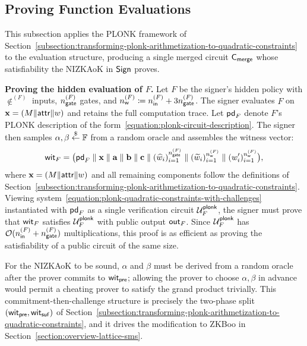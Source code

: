 \subsection{Proving \SMS Function Evaluations}
\label{subsection:proving-sms-function-evaluations}

This subsection applies the PLONK framework of
Section~\ref{subsection:transforming-plonk-arithmetization-to-quadratic-constraints}
to the \SMS evaluation structure,
producing a single merged circuit $\mathsf{C}_\mathsf{merge}$
whose satisfiability the NIZKAoK in $\mathsf{Sign}$ proves.

\medskip
\noindent\textbf{Proving the hidden evaluation of $F$.}
Let $F$ be the signer's hidden policy
with $\nin^{(F)}$ inputs, $n_\mathsf{gate}^{(F)}$ gates,
and $n_\mathsf{w}^{(F)} \coloneqq n_\mathsf{in}^{(F)} + 3n_\mathsf{gate}^{(F)}$.
The signer evaluates $F$ on $\mathbf{x} = (M \| \mathsf{attr} \| w)$
and retains the full computation trace.
Let $\mathsf{pd}_F$ denote $F$'s PLONK description
of the form~\eqref{equation:plonk-circuit-description}.
The signer then samples $\alpha, \beta \stackrel{\$}{\gets} \mathbb{F}$ from a random oracle
and assembles the witness vector:
\begin{equation}\label{equation:sms-ww-F}
\mathsf{wit}_F =
\bigl(
\mathsf{pd}_F \;\|\;
\mathbf{x} \;\|\; \mathbf{a} \;\|\; \mathbf{b} \;\|\; \mathbf{c} \;\|\;
(\widehat{w}_i)_{i = 1}^{n_\mathsf{gate}^{(F)}} \;\|\;
(\widetilde{w}_i)_{i = 1}^{n_\mathsf{w}^{(F)}} \;\|\;
(w'_i)_{i = 1}^{n_\mathsf{w}^{(F)}}
\bigr),
\end{equation}
where $\mathbf{x} = (M \| \mathsf{attr} \| w)$
and all remaining components follow the definitions of
Section~\ref{subsection:transforming-plonk-arithmetization-to-quadratic-constraints}.
Viewing system~\eqref{equation:plonk-quadratic-constraints-with-challenges}
instantiated with $\mathsf{pd}_F$ as a single verification circuit
$\mathcal{U}^\mathsf{plonk}_F$,
the signer must prove that $\mathsf{wit}_F$ satisfies $\mathcal{U}^\mathsf{plonk}_F$
with public output $\mathsf{out}_F$.
Since $\mathcal{U}^\mathsf{plonk}_F$ has
$\mathcal{O}(n_\mathsf{in}^{(F)} + n_\mathsf{gate}^{(F)})$ multiplications,
this proof is as efficient as proving the satisfiability
of a public circuit of the same size.

For the NIZKAoK to be sound, $\alpha$ and $\beta$ must be derived from a random oracle
after the prover commits to $\mathsf{wit}_\mathsf{pre}$;
allowing the prover to choose $\alpha, \beta$ in advance would permit a cheating prover
to satisfy the grand product trivially.
This commitment-then-challenge structure is precisely the two-phase split
$(\mathsf{wit}_\mathsf{pre}, \mathsf{wit}_\mathsf{suf})$ of Section~\ref{subsection:transforming-plonk-arithmetization-to-quadratic-constraints},
and it drives the modification to ZKBoo in Section~\ref{section:overview-lattice-sms}.


